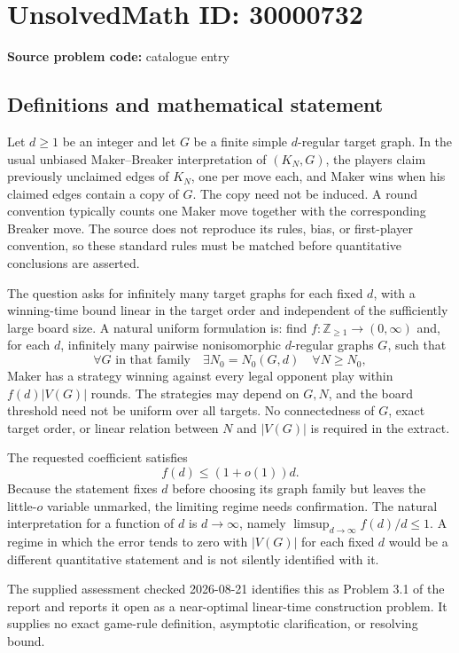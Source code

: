 \documentclass[11pt]{article}
\newcommand{\Z}{\mathbb{Z}}
\begin{document}
\section*{UnsolvedMath ID: 30000732}
\textbf{Source problem code:} catalogue entry
\subsection{Definitions and mathematical statement}
Let \(d\geq1\) be an integer and let \(G\) be a finite simple \(d\)-regular target graph. In the usual unbiased Maker--Breaker interpretation of \((K_N,G)\), the players claim previously unclaimed edges of \(K_N\), one per move each, and Maker wins when his claimed edges contain a copy of \(G\). The copy need not be induced. A round convention typically counts one Maker move together with the corresponding Breaker move. The source does not reproduce its rules, bias, or first-player convention, so these standard rules must be matched before quantitative conclusions are asserted.

The question asks for infinitely many target graphs for each fixed \(d\), with a winning-time bound linear in the target order and independent of the sufficiently large board size. A natural uniform formulation is: find \(f:\Z_{\geq1}\to(0,\infty)\) and, for each \(d\), infinitely many pairwise nonisomorphic \(d\)-regular graphs \(G\), such that
\[
\forall G\text{ in that family}\quad\exists N_0=N_0(G,d)\quad
\forall N\geq N_0,
\]
Maker has a strategy winning against every legal opponent play within \(f(d)|V(G)|\) rounds. The strategies may depend on \(G,N\), and the board threshold need not be uniform over all targets. No connectedness of \(G\), exact target order, or linear relation between \(N\) and \(|V(G)|\) is required in the extract.

The requested coefficient satisfies
\[
f(d)\leq(1+o(1))d.
\]
Because the statement fixes \(d\) before choosing its graph family but leaves the little-\(o\) variable unmarked, the limiting regime needs confirmation. The natural interpretation for a function of \(d\) is \(d\to\infty\), namely \(\limsup_{d\to\infty}f(d)/d\leq1\). A regime in which the error tends to zero with \(|V(G)|\) for each fixed \(d\) would be a different quantitative statement and is not silently identified with it.

The supplied assessment checked 2026-08-21 identifies this as Problem 3.1 of the report and reports it open as a near-optimal linear-time construction problem. It supplies no exact game-rule definition, asymptotic clarification, or resolving bound.
\end{document}
